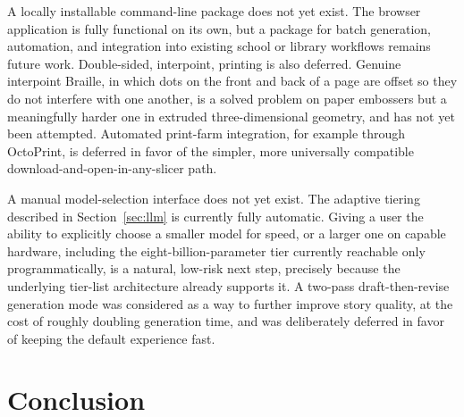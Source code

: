 \documentclass[conference]{IEEEtran}
\begin{document}
A locally installable command-line package does not yet exist. The browser application is fully functional on its own, but a package for batch generation, automation, and integration into existing school or library workflows remains future work. Double-sided, interpoint, printing is also deferred. Genuine interpoint Braille, in which dots on the front and back of a page are offset so they do not interfere with one another, is a solved problem on paper embossers but a meaningfully harder one in extruded three-dimensional geometry, and has not yet been attempted. Automated print-farm integration, for example through OctoPrint, is deferred in favor of the simpler, more universally compatible download-and-open-in-any-slicer path.

A manual model-selection interface does not yet exist. The adaptive tiering described in Section~\ref{sec:llm} is currently fully automatic. Giving a user the ability to explicitly choose a smaller model for speed, or a larger one on capable hardware, including the eight-billion-parameter tier currently reachable only programmatically, is a natural, low-risk next step, precisely because the underlying tier-list architecture already supports it. A two-pass draft-then-revise generation mode was considered as a way to further improve story quality, at the cost of roughly doubling generation time, and was deliberately deferred in favor of keeping the default experience fast.

\section{Conclusion}\label{sec:conclusion}
\end{document}

